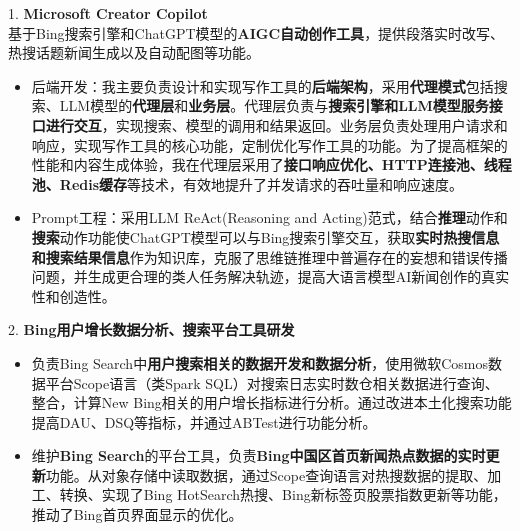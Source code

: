 \documentclass{resume}
\begin{document}

  1. \textbf{Microsoft Creator Copilot} 
  \\
  基于Bing搜索引擎和ChatGPT模型的\textbf{AIGC自动创作工具}，提供段落实时改写、热搜话题新闻生成以及自动配图等功能。
  \begin{spacing}{1.2} 
  \begin{itemize}
    \item 后端开发：我主要负责设计和实现写作工具的\textbf{后端架构}，采用\textbf{代理模式}包括搜索、LLM模型的\textbf{代理层}和\textbf{业务层}。代理层负责与\textbf{搜索引擎和LLM模型服务接口进行交互}，实现搜索、模型的调用和结果返回。业务层负责处理用户请求和响应，实现写作工具的核心功能，定制优化写作工具的功能。为了提高框架的性能和内容生成体验，我在代理层采用了\textbf{接口响应优化、HTTP连接池、线程池、Redis缓存}等技术，有效地提升了并发请求的吞吐量和响应速度。
    \item Prompt工程：采用LLM ReAct(Reasoning and Acting)范式，结合\textbf{推理}动作和\textbf{搜索}动作功能使ChatGPT模型可以与Bing搜索引擎交互，获取\textbf{实时热搜信息和搜索结果信息}作为知识库，克服了思维链推理中普遍存在的妄想和错误传播问题，并生成更合理的类人任务解决轨迹，提高大语言模型AI新闻创作的真实性和创造性。
  \end{itemize}
  2. \textbf{Bing用户增长数据分析、搜索平台工具研发}
  \begin{itemize}
    \item 负责Bing Search中\textbf{用户搜索相关的数据开发和数据分析}，使用微软Cosmos数据平台Scope语言（类Spark SQL）对搜索日志实时数仓相关数据进行查询、整合，计算New Bing相关的用户增长指标进行分析。通过改进本土化搜索功能提高DAU、DSQ等指标，并通过ABTest进行功能分析。
    \item 维护\textbf{Bing Search}的平台工具，负责\textbf{Bing中国区首页新闻热点数据的实时更新}功能。从对象存储中读取数据，通过Scope查询语言对热搜数据的提取、加工、转换、实现了Bing HotSearch热搜、Bing新标签页股票指数更新等功能，推动了Bing首页界面显示的优化。
  \end{itemize}
\end{spacing}
 
\end{document}
